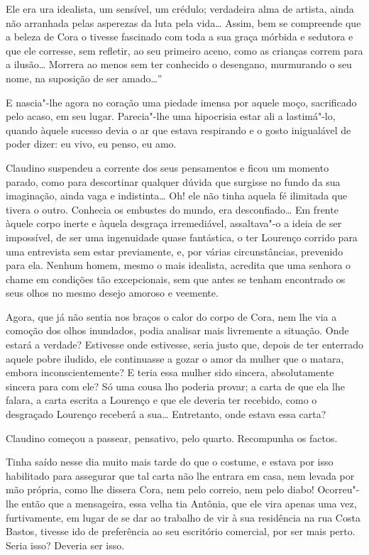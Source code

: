 Ele era ura idealista, um sensível, um crédulo; verdadeira alma de
artista, ainda não arranhada pelas asperezas da luta pela vida\ldots{} Assim,
bem se compreende que a beleza de Cora o tivesse fascinado com toda a
sua graça mórbida e sedutora e que ele corresse, sem refletir, ao seu
primeiro aceno, como as crianças correm para a ilusão\ldots{} Morrera ao
menos sem ter conhecido o desengano, murmurando o seu nome, na suposição
de ser amado\ldots{}''

E nascia"-lhe agora no coração uma piedade imensa por aquele moço,
sacrificado pelo acaso, em seu lugar. Parecia"-lhe uma hipocrisia estar
ali a lastimá"-lo, quando àquele sucesso devia o ar que estava respirando
e o gosto inigualável de poder dizer: eu vivo, eu penso, eu amo.

Claudino suspendeu a corrente dos seus pensamentos e ficou um momento
parado, como para descortinar qualquer dúvida que surgisse no fundo da
sua imaginação, ainda vaga e indistinta\ldots{} Oh! ele não tinha aquela fé
ilimitada que tivera o outro. Conhecia os embustes do mundo, era
desconfiado\ldots{} Em frente àquele corpo inerte e àquela desgraça
irremediável, assaltava"-o a ideia de ser impossível, de ser uma
ingenuidade quase fantástica, o ter Lourenço corrido para uma entrevista
sem estar previamente, e, por várias circunstâncias, prevenido para ela.
Nenhum homem, mesmo o mais idealista, acredita que uma senhora o chame
em condições tão excepcionais, sem que antes se tenham encontrado os
seus olhos no mesmo desejo amoroso e veemente.

Agora, que já não sentia nos braços o calor do corpo de Cora, nem lhe
via a comoção dos olhos inundados, podia analisar mais livremente a
situação. Onde estará a verdade? Estivesse onde estivesse, seria justo
que, depois de ter enterrado aquele pobre iludido, ele continuasse a
gozar o amor da mulher que o matara, embora inconscientemente? E teria
essa mulher sido sincera, absolutamente sincera para com ele? Só uma
cousa lho poderia provar; a carta de que ela lhe falara, a carta escrita
a Lourenço e que ele deveria ter recebido, como o desgraçado Lourenço receberá a
sua\ldots{} Entretanto, onde estava essa carta?

Claudino começou a passear, pensativo, pelo quarto. Recompunha os
factos.

Tinha saído nesse dia muito mais tarde do que o costume, e estava por
isso habilitado para assegurar que tal carta não lhe entrara em casa,
nem levada por mão própria, como lhe dissera Cora, nem pelo correio, nem
pelo diabo! Ocorreu"-lhe então que
a mensageira, essa velha tia Antônia, que ele vira apenas uma vez,
furtivamente, em lugar de se dar ao trabalho de vir à sua residência na
rua Costa Bastos, tivesse ido de preferência ao seu escritório
comercial, por ser mais perto. Seria isso? Deveria ser isso.

